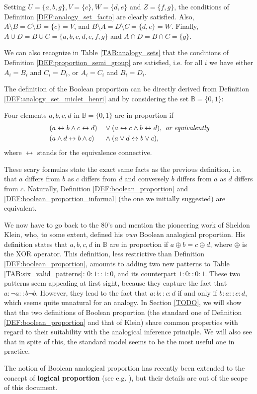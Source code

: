 Setting $U = \{a, b, g\}, V = \{c\}, W = \{d, e\}$ and $Z = \{f, g\}$, the
conditions of Definition  \ref{DEF:analogy_set_facto}  are clearly satisfied.
Also, $A \setminus B = C \setminus D = \{c\} = V$, and $B\setminus A = D
\setminus C = \{d, e\} = W$. Finally, $A \cup D = B \cup C = \{a, b, c, d, e,
f, g\}$ and $A\cap D = B\cap C = \{g\}$.

We can also recognize in Table \ref{TAB:analogy_sets} that the conditions of
Definition \ref{DEF:proportion_semi_group} are satisfied, i.e. for all $i$ we
have either $A_i = B_i$ and $C_i = D_i$, or $A_i = C_i$ and $B_i = D_i$.

The definition of the Boolean proportion can be directly derived from
Definition \ref{DEF:analogy_set_miclet_henri} and by considering the set
$\mathbb{B} = \{0, 1\}$:

\begin{definition}
  \label{DEF:boolean_proportion}
  Four elements $a, b, c, d$ in $\mathbb{B} = \{0, 1\}$ are in proportion if
  \begin{alignat*}{2}
    &(a \leftrightarrow b \wedge c \leftrightarrow d) && \vee (a
    \leftrightarrow c \wedge b \leftrightarrow d), \emph{ or equivalently}\\
     & (a \wedge d \leftrightarrow b \wedge c) &&\wedge (a \vee  d
    \leftrightarrow b \vee c),
  \end{alignat*}
  where $\leftrightarrow$ stands for the equivalence connective.
\end{definition}

These scary formulas state the exact same facts as the previous definition,
i.e. that $a$ differs from $b$ as $c$ differs from $d$ and conversely $b$
differs from $a$ as $d$ differs from $c$. Naturally, Definition
\ref{DEF:boolean_proportion} and \ref{DEF:boolean_proportion_informal} (the one
we initially suggested) are equivalent.

We now have to go back to the 80's and mention the pioneering work of Sheldon
Klein, who, to some extent, defined his \textit{own} Boolean analogical
proportion. His definition states that $a, b, c, d$ in $\mathbb{B}$ are in
proportion if $a \oplus b = c \oplus d$, where $\oplus$ is the XOR operator.
This definition, less restrictive than Definition \ref{DEF:boolean_proportion},
amounts to adding two new patterns to Table \ref{TAB:six_valid_patterns}:
$0:1::1:0$, and its counterpart $1:0::0:1$. These two patterns seem appealing at
first sight, because they capture the fact that $a : \neg a :: b \neg b$.
However, they lead to the fact that $a:b::c:d$ if and only if $b : a :: c :d$,
which seems quite unnatural for an analogy. In Section \ref{TODO}, we will show
that the two definitions of Boolean proportion (the standard one of Definition
\ref{DEF:boolean_proportion} and that of Klein) share common properties with
regard to their suitability with the analogical inference principle. We will
also see that in spite of this, the standard model seems to be the most useful
one in practice.

The notion of Boolean analogical proportion has recently been extended to the
concept of \textbf{logical proportion} (see e.g. \cite{PraRic14}), but their
details are out of the scope of this document.
